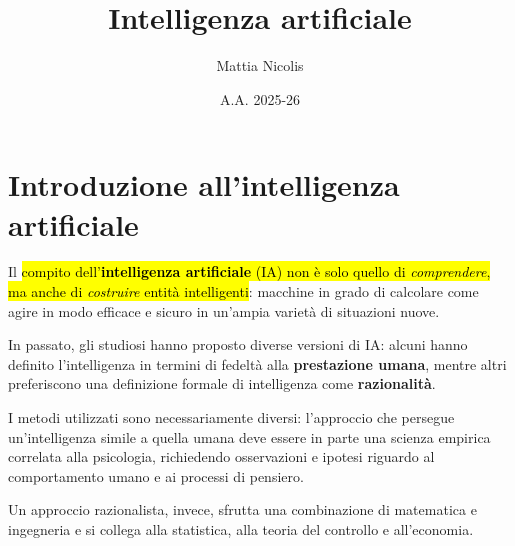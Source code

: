 \documentclass[a4paper, 12pt]{book}
\title{\textbf{Intelligenza artificiale}}
\author{Mattia Nicolis}
\date{A.A. 2025-26}
\begin{document}
    \maketitle

    \tableofcontents
    \markboth{}{}

    \chapter*{Introduzione all'intelligenza artificiale}
    Il \hl{compito dell’\textbf{intelligenza artificiale} (IA) non è solo quello di \textit{comprendere}, ma anche di \textit{costruire} entità intelligenti}: macchine in grado di calcolare come agire in modo efficace e sicuro in un’ampia varietà di situazioni nuove.

    In passato, gli studiosi hanno proposto diverse versioni di IA: alcuni hanno definito l’intelligenza in termini di fedeltà alla \textbf{prestazione umana}, mentre altri preferiscono una definizione formale di intelligenza come \textbf{razionalità}.

    I metodi utilizzati sono necessariamente diversi: l’approccio che persegue un’intelligenza simile a quella umana deve essere in parte una scienza empirica correlata alla psicologia, richiedendo osservazioni e ipotesi riguardo al comportamento umano e ai processi di pensiero.

    Un approccio razionalista, invece, sfrutta una combinazione di matematica e ingegneria e si collega alla statistica, alla teoria del controllo e all’economia.
\end{document}
